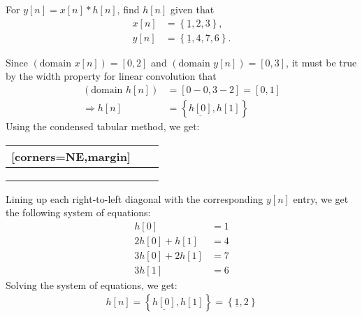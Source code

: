 \documentclass{report}
\begin{document}
\begin{example}
    For $y[n]=x[n]*h[n]$, find $h[n]$ given that  
    \begin{align*}
        x[n] &= \left\{\underline{1},2,3\right\}, \\
        y[n] &= \left\{\underline{1},4,7,6\right\}.
    \end{align*}
\end{example}
\begin{solution}
    Since $(\text{domain }x[n]) = [0,2]$ and $(\text{domain }y[n]) = [0,3]$, it must be true by the width property for linear convolution that 
    \begin{align*}
        (\text{domain }h[n]) &= [0-0,3-2] = [0,1] \\
        \Longrightarrow h[n] &= \left\{\underline{h[0]},h[1]\right\}
    \end{align*}
    Using the condensed tabular method, we get:
    \begin{center}
        \begin{NiceTabular}{p{1cm}|p{1cm} p{1cm}}[corners=NE,margin]
            \rule{0pt}{2em} &  &  \\
            \hline
             &  &  \\
             &  &  \\
             &  &  
        \end{NiceTabular}
    \end{center}
    Lining up each right-to-left diagonal with the corresponding $y[n]$ entry, we get the following system of equations:
    \begin{align*}
        h[0] &= 1 \\
        2h[0] + h[1] &= 4 \\
        3h[0] + 2h[1] &= 7 \\
        3h[1] &= 6
    \end{align*}
    Solving the system of equations, we get:
    \begin{align*}
        h[n] = \left\{\underline{h[0]},h[1]\right\} = \left\{\underline{1},2\right\}
    \end{align*}
\end{solution}
\end{document}
